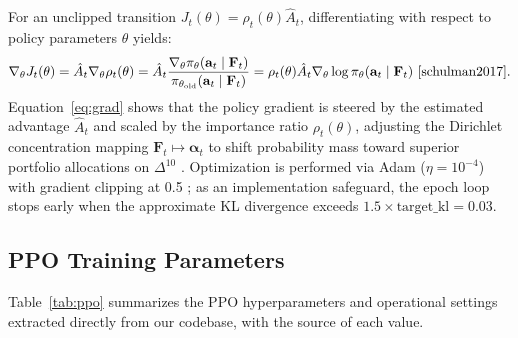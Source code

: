 \documentclass[11pt,a4paper]{article}
\numberwithin{equation}{section}
\numberwithin{table}{section}
\numberwithin{figure}{section}
\numberwithin{algorithm}{section}
\newcommand{\F}{\mathbf{F}}
\newcommand{\ba}{\mathbf{a}}
\newcommand{\balpha}{\bm{\alpha}}
\begin{document}
For an unclipped transition $J_t(\theta)=\rho_t(\theta)\hat A_t$, differentiating with respect to policy parameters $\theta$ yields:
\begin{equation}
\nabla_\theta J_t(\theta)=\hat A_t\nabla_\theta\rho_t(\theta)=\hat A_t\frac{\nabla_\theta\pi_\theta(\ba_t\mid\F_t)}{\pi_{\theta_{\mathrm{old}}}(\ba_t\mid\F_t)}=\rho_t(\theta)\hat A_t\nabla_\theta\log\pi_\theta(\ba_t\mid\F_t)\ \cite{schulman2017}.\label{eq:grad}
\end{equation}
Equation~\eqref{eq:grad} shows that the policy gradient is steered by the estimated advantage $\hat A_t$ and scaled by the importance ratio $\rho_t(\theta)$, adjusting the Dirichlet concentration mapping $\F_t\mapsto\balpha_t$ to shift probability mass toward superior portfolio allocations on $\Delta^{10}$ \cite{yang2022}. Optimization is performed via Adam ($\eta=10^{-4}$) with gradient clipping at 0.5 \cite{zou2024}; as an implementation safeguard, the epoch loop stops early when the approximate KL divergence exceeds $1.5\times\mathrm{target\_kl}=0.03$.

\subsection{PPO Training Parameters}
Table~\ref{tab:ppo} summarizes the PPO hyperparameters and operational settings extracted directly from our codebase, with the source of each value.
\end{document}
